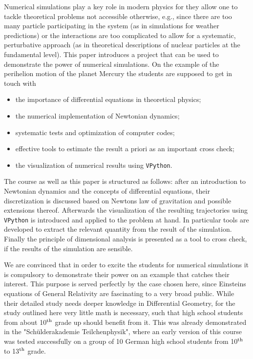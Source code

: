 \documentclass[12pt, UK english]{iopart}
\begin{document}
Numerical simulations play a key role in modern physics for they allow one to tackle theoretical problems not accessible otherwise, e.g., since there are too many particle participating in the system (as in simulations for weather predictions) or the interactions are too complicated to allow for a systematic, perturbative approach (as in theoretical descriptions of nuclear particles at the fundamental level).
This paper introduces a project that can be used to demonstrate the power of numerical simulations.
On the example of the perihelion motion of the planet Mercury the students are supposed to get in touch with
\begin{itemize}
\item the importance of differential equations in theoretical physics;
\item the numerical implementation of Newtonian dynamics;
\item systematic tests and optimization of computer codes;
\item effective tools to estimate the result a priori as an important cross check;
\item the visualization of numerical results using \texttt{VPython}.
\end{itemize}
The course as well as this paper is structured as follows: after an introduction to Newtonian dynamics and the concepts of differential equations, their discretization is discussed based on Newtons law of gravitation and possible extensions thereof.
Afterwards the visualization of the resulting trajectories using \texttt{VPython} is introduced and applied to the problem at hand. In particular tools are developed to extract the relevant quantity from the result of the simulation.
Finally the principle of dimensional analysis is presented as a tool to cross check, if the results of the simulation are sensible.

We are convinced that in order to excite the students for numerical simulations it is compulsory to demonstrate their power on an example that catches their interest.
This purpose is served perfectly by the case chosen here, since Einsteins equations of General Relativity are fascinating to a very broad public.
While their detailed study needs deeper knowledge in Differential Geometry, for the study outlined here very little math is necessary, such that high school students from about 10$^{\rm th}$ grade up should benefit from it.
This was already demonstrated in the "Schülderakademie Teilchenphysik", where an early version of this course was tested successfully on a group of 10 German high school students from 10$^{\rm th}$ to 13$^{\rm th}$ grade.
\end{document}
